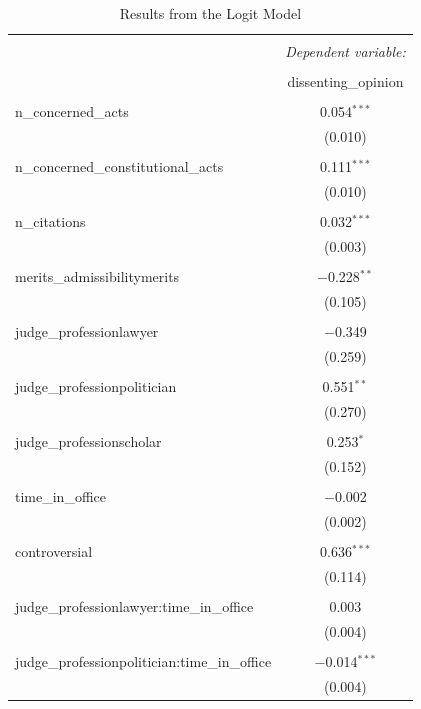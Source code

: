 \documentclass[
  11pt,
]{article}
\begin{document}
\begin{table}[!htbp] \centering 
  \caption{Results from the Logit Model} 
  \label{} 
\begin{tabular}{@{\extracolsep{5pt}}lc} 
\\[-1.8ex]\hline 
\hline \\[-1.8ex] 
 & \multicolumn{1}{c}{\textit{Dependent variable:}} \\ 
\cline{2-2} 
\\[-1.8ex] & dissenting\_opinion \\ 
\hline \\[-1.8ex] 
 n\_concerned\_acts & 0.054$^{***}$ \\ 
  & (0.010) \\ 
  & \\ 
 n\_concerned\_constitutional\_acts & 0.111$^{***}$ \\ 
  & (0.010) \\ 
  & \\ 
 n\_citations & 0.032$^{***}$ \\ 
  & (0.003) \\ 
  & \\ 
 merits\_admissibilitymerits & $-$0.228$^{**}$ \\ 
  & (0.105) \\ 
  & \\ 
 judge\_professionlawyer & $-$0.349 \\ 
  & (0.259) \\ 
  & \\ 
 judge\_professionpolitician & 0.551$^{**}$ \\ 
  & (0.270) \\ 
  & \\ 
 judge\_professionscholar & 0.253$^{*}$ \\ 
  & (0.152) \\ 
  & \\ 
 time\_in\_office & $-$0.002 \\ 
  & (0.002) \\ 
  & \\ 
 controversial & 0.636$^{***}$ \\ 
  & (0.114) \\ 
  & \\ 
 judge\_professionlawyer:time\_in\_office & 0.003 \\ 
  & (0.004) \\ 
  & \\ 
 judge\_professionpolitician:time\_in\_office & $-$0.014$^{***}$ \\ 
  & (0.004) \\ 

\end{tabular}
\end{table}
\end{document}
